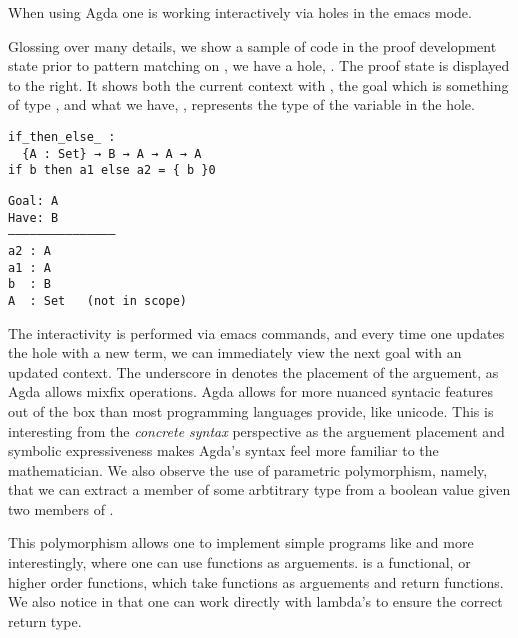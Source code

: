 When using Agda one is working interactively via holes in the emacs mode.

Glossing over many details, we show a sample of code in the proof development
state prior to pattern matching on , we have a hole, . The proof state is displayed to the right. It shows both the current
context with , the goal which is something of type
, and what we have, , represents the type of the
variable in the hole.

\hfill
\begin{minipage}[t]{.4\textwidth}
\begin{verbatim}
if_then_else_ :
  {A : Set} → B → A → A → A
if b then a1 else a2 = { b }0
\end{verbatim}
\end{minipage}
\hfill
\begin{minipage}[t]{.5\textwidth}
\begin{verbatim}
Goal: A
Have: B
———————————————
a2 : A
a1 : A
b  : B
A  : Set   (not in scope)
\end{verbatim}
\end{minipage}

The interactivity is performed via emacs commands, and every time one updates
the hole with a new term, we can immediately view the next goal with an updated
context. The underscore in  denotes the placement of the
arguement, as Agda allows mixfix operations. Agda allows for more nuanced
syntacic features out of the box than most programming languages provide, like
unicode. This is interesting from the \emph{concrete syntax} perspective as the
arguement placement and symbolic expressiveness makes Agda's syntax feel more
familiar to the mathematician. We also observe the use of parametric
polymorphism, namely, that we can extract a member of some arbtitrary type
 from a boolean value given two members of .

This polymorphism allows one to implement simple programs like \term{~} and more
interestingly,  where one can use functions as
arguements.  is a functional, or higher order
functions, which take functions as arguements and return functions. We also
notice in  that one can work directly with lambda's to
ensure the correct return type.


